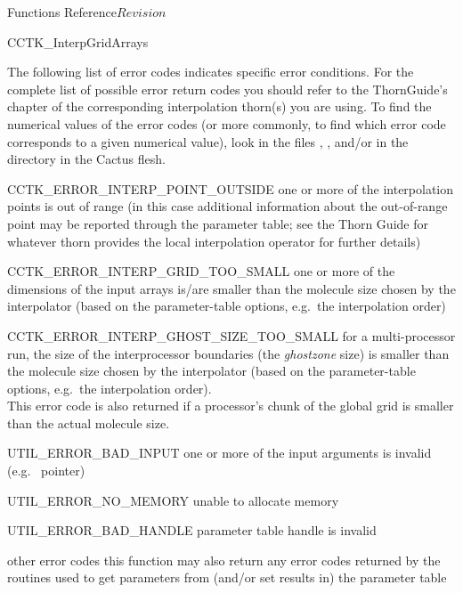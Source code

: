 \begin{cactuspart}{ Functions Reference}{}{$Revision$}
\begin{FunctionDescription}{CCTK\_InterpGridArrays}
\begin{ErrorSection}
\begin{Error}{}
The following list of error
codes indicates specific error conditions. For the complete list of possible
error return codes you should refer to the ThornGuide's chapter of the
corresponding interpolation thorn(s) you are using.  To find the numerical
values of the error codes (or more commonly, to find which error code
corresponds to a given numerical value), look in the files
, , and/or 
in the  directory in the Cactus flesh.
\end{Error}
\begin{Error}{CCTK\_ERROR\_INTERP\_POINT\_OUTSIDE}
one or more of the interpolation points is out of range
(in this case additional information about the out-of-range point
may be reported through the parameter table; see the Thorn Guide for
whatever thorn provides the local interpolation operator for further
details)
\end{Error}
\begin{Error}{CCTK\_ERROR\_INTERP\_GRID\_TOO\_SMALL}
one or more of the dimensions of the input arrays is/are smaller than
the molecule size chosen by the interpolator (based on the parameter-table
options, e.g.\ the interpolation order)
\end{Error}
\begin{Error}{CCTK\_ERROR\_INTERP\_GHOST\_SIZE\_TOO\_SMALL}
for a multi-processor run, the size of the interprocessor boundaries (the {\em ghostzone} size) is smaller than the molecule size chosen by the interpolator
(based on the parameter-table options, e.g.\ the interpolation order).\\
This error code is also returned if a processor's chunk of the global grid
is smaller than the actual molecule size.
\end{Error}
\begin{Error}{UTIL\_ERROR\_BAD\_INPUT}
one or more of the input arguments is invalid (e.g.~ pointer)
\end{Error}
\begin{Error}{UTIL\_ERROR\_NO\_MEMORY}
unable to allocate memory
\end{Error}
\begin{Error}{UTIL\_ERROR\_BAD\_HANDLE}
parameter table handle is invalid
\end{Error}
\begin{Error}{other error codes}
this function may also return any error codes returned by the
 routines used to get parameters from
(and/or set results in) the parameter table
\end{Error}
\end{ErrorSection}


\end{FunctionDescription}
\end{cactuspart}
